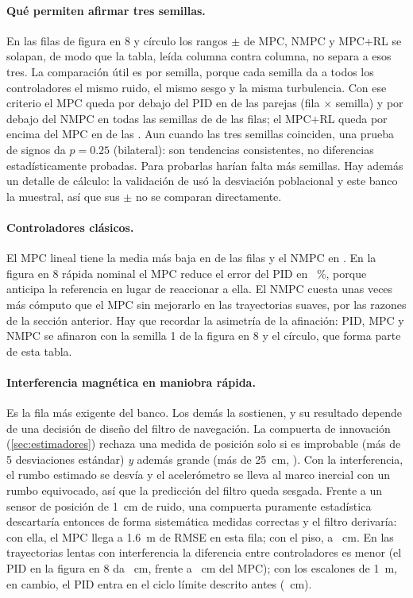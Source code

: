 \paragraph{Qué permiten afirmar tres semillas.} En las filas de figura en 8
y círculo los rangos $\pm$ de MPC, NMPC y MPC+RL se solapan, de modo que la
tabla, leída columna contra columna, no separa a esos tres. La comparación
útil es por semilla, porque cada semilla da a todos los controladores el
mismo ruido, el mismo sesgo y la misma turbulencia. Con ese criterio el MPC
queda por debajo del PID en  de las  parejas
(fila $\times$ semilla) y por debajo del NMPC en todas las semillas de
 de las  filas; el MPC+RL queda por
encima del MPC en  de las . Aun cuando
las tres semillas coinciden, una prueba de signos da $p=0.25$ (bilateral):
son tendencias consistentes, no diferencias estadísticamente probadas. Para
probarlas harían falta más semillas. Hay además un detalle de cálculo: la
validación de  usó la desviación poblacional y este banco
la muestral, así que sus $\pm$ no se comparan directamente.

\paragraph{Controladores clásicos.} El MPC lineal tiene la media más baja en
 de las  filas y el NMPC en . En la
figura en 8 rápida nominal el MPC reduce el error del PID en
~\%, porque anticipa la referencia en lugar de reaccionar a
ella. El NMPC cuesta unas  veces más cómputo que el MPC sin
mejorarlo en las trayectorias suaves, por las razones de la sección
anterior. Hay que recordar la asimetría de la afinación: PID, MPC y NMPC se
afinaron con la semilla 1 de la figura en 8 y el círculo, que forma parte
de esta tabla.

\paragraph{Interferencia magnética en maniobra rápida.} Es la fila más
exigente del banco.  Los demás la sostienen, y su
resultado depende de una decisión de diseño del filtro de navegación. La
compuerta de innovación (\cref{sec:estimadores}) rechaza una medida de
posición solo si es improbable (más de 5 desviaciones estándar) \emph{y}
además grande (más de 25~cm, ). Con la interferencia, el
rumbo estimado se desvía y el acelerómetro se lleva al marco inercial con
un rumbo equivocado, así que la predicción del filtro queda sesgada. Frente a
un sensor de posición de 1~cm de ruido, una compuerta puramente estadística
descartaría entonces de forma sistemática medidas correctas y el filtro
derivaría: con ella, el MPC llega a 1.6~m de RMSE en esta fila; con el
piso, a ~cm. En las trayectorias lentas con
interferencia la diferencia entre controladores es menor (el PID en la
figura en 8 da ~cm, frente a
~cm del MPC); con los escalones de 1~m, en cambio,
el PID entra en el ciclo límite descrito antes
(~cm).

